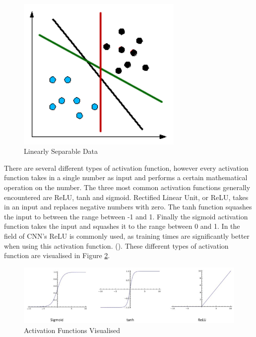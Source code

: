 \documentclass[12pt]{report}
\begin{document}
\vspace{0.5cm}
\begin{figure}[ht!]
	\centering
	\includegraphics[width=8cm]{linear}
	\caption{Linearly Separable Data}
	\label{fig:linear}
\end{figure}

\begin{flushleft}
There are several different types of activation function, however every activation function takes in a single number as input and performs a certain mathematical operation on the number. The three most common activation functions generally encountered are ReLU, tanh and sigmoid. Rectified Linear Unit, or ReLU, takes in an input and replaces negative numbers with zero. The tanh function squashes the input to between the range between -1 and 1. Finally the sigmoid activation function takes the input and squashes it to the range between 0 and 1. In the field of CNN's ReLU is commonly used, as training times are significantly better when using this activation function. (\cite{krizhevsky2012imagenet}). These different types of activation function are visualised in Figure \ref{fig:functions}.
\end{flushleft}

\vspace{0.5cm}
\begin{figure}[ht!]
	\centering
	\includegraphics[width=12cm]{functions}
	\caption{Activation Functions Visualised}
	\label{fig:functions}
\end{figure}
\end{document}
